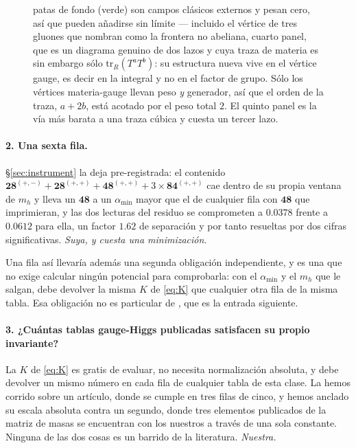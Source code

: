 \documentclass[11pt,a4paper]{article}
\newcommand{\rep}[1]{\mathbf{#1}}
\newcommand{\amin}{\alpha_{\min}}
\begin{document}
\begin{figure}[htbp]
{patas de fondo (verde) son campos clásicos externos y pesan cero, así que pueden añadirse sin límite
--- incluido el vértice de tres gluones que \cite{HMTY} nombran como la frontera no abeliana, cuarto
panel, que es un diagrama genuino de dos lazos y cuya traza de materia es sin embargo sólo
$\mathrm{tr}_R(T^aT^b)$: su estructura nueva vive en el vértice gauge, es decir en la integral y no
en el factor de grupo. Sólo los vértices materia-gauge llevan peso \emph{y} generador, así que el
orden de la traza, $a+2b$, está acotado por el peso total $2$. El quinto panel es la vía más barata a
una traza cúbica y cuesta un tercer lazo.}\label{fig:twoloop}
\end{figure}

\paragraph{2. Una sexta fila.} \S\ref{sec:instrument} la deja pre-registrada: el contenido
$\rep{28}^{(+,-)}+\rep{28}^{(+,+)}+\rep{48}^{(+,+)}+3\times\rep{84}^{(+,+)}$ cae dentro de su propia
ventana de $m_h$ y lleva un $\rep{48}$ a un $\amin$ mayor que el de cualquier fila con $\rep{48}$ que
imprimieran, y las dos lecturas del residuo se comprometen a $0.0378$ frente a $0.0612$ para ella, un
factor $1.62$ de separación y por tanto resueltas por dos cifras significativas.
\emph{Suya, y cuesta una minimización.}

Una fila así llevaría además una segunda obligación independiente, y es una que no exige calcular
ningún potencial para comprobarla: con el $\amin$ y el $m_h$ que le salgan, debe devolver la misma
$K$ de \eqref{eq:K} que cualquier otra fila de la misma tabla. Esa obligación no es particular de
\cite{KM25}, que es la entrada siguiente.

\paragraph{3. ¿Cuántas tablas gauge-Higgs publicadas satisfacen su propio invariante?} La $K$ de
\eqref{eq:K} es gratis de evaluar, no necesita normalización absoluta, y debe devolver un mismo
número en cada fila de cualquier tabla de esta clase. La hemos corrido sobre un artículo, donde se
cumple en tres filas de cinco, y hemos anclado su escala absoluta contra un segundo, donde tres
elementos publicados de la matriz de masas se encuentran con los nuestros a través de una sola
constante. Ninguna de las dos cosas es un barrido de la literatura. \emph{Nuestra.}
\end{document}
